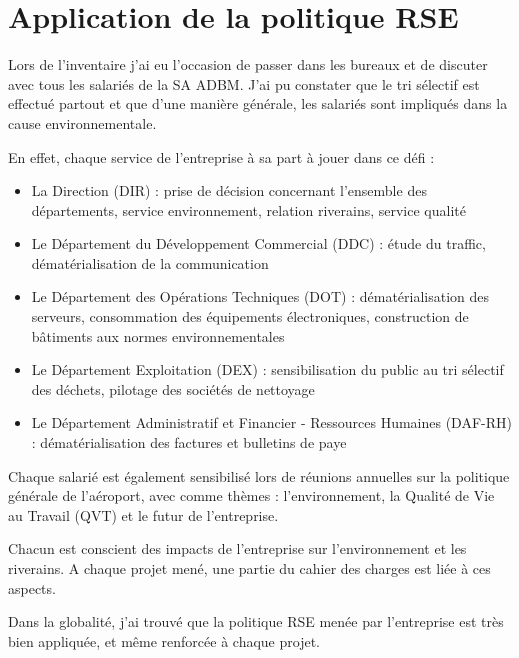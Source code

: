 \section{Application de la politique RSE}

Lors de l'inventaire j'ai eu l'occasion de passer dans les bureaux et de discuter avec tous les salariés de la SA ADBM. J'ai pu constater que le tri sélectif est effectué partout et que d'une manière générale, les salariés sont impliqués dans la cause environnementale.\newline

En effet, chaque service de l'entreprise à sa part à jouer dans ce défi :

\begin{itemize}
    \item La Direction (DIR) : prise de décision concernant l'ensemble des départements, service environnement, relation riverains, service qualité
    \item Le Département du Développement Commercial (DDC) : étude du traffic, dématérialisation de la communication
    \item Le Département des Opérations Techniques (DOT) : dématérialisation des serveurs, consommation des équipements électroniques, construction de bâtiments aux normes environnementales
    \item Le Département Exploitation (DEX) : sensibilisation du public au tri sélectif des déchets, pilotage des sociétés de nettoyage
    \item Le Département Administratif et Financier - Ressources Humaines (DAF-RH) : dématérialisation des factures et bulletins de paye\newline
\end{itemize}

Chaque salarié est également sensibilisé lors de réunions annuelles sur la politique générale de l'aéroport, avec comme thèmes : l'environnement, la Qualité de Vie au Travail (QVT) et le futur de l'entreprise.

Chacun est conscient des impacts de l'entreprise sur l'environnement et les riverains. A chaque projet mené, une partie du cahier des charges est liée à ces aspects.\newline

Dans la globalité, j’ai trouvé que la politique RSE menée par l’entreprise est très bien appliquée, et même renforcée à chaque projet.
